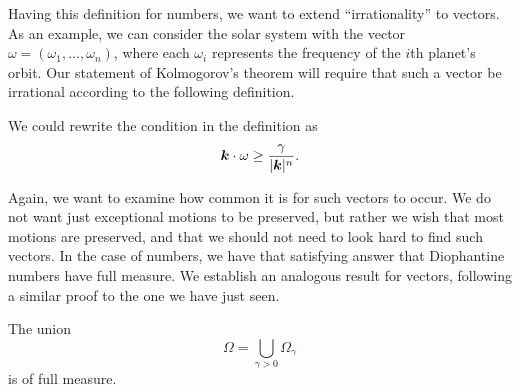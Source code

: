 \documentclass[twoside,letterpaper,10pt]{article}
\begin{document}
Having this definition for numbers, we want to extend ``irrationality'' to
vectors.
As an example, we can consider the solar system with the vector $\omega =
(\omega_1, \ldots, \omega_n)$, where each $\omega_i$ represents the frequency of
the $i$th planet's orbit.
Our statement of Kolmogorov's theorem will require that such a vector be
irrational according to the following definition.
\begin{defn}
  \diovector{}
\end{defn}
We could rewrite the condition in the definition as
\begin{equation}
  \label{eq:diovec}
  \bm{k} \cdot \omega \geq \frac{\gamma}{|\bm{k}|^n}.
\end{equation}

Again, we want to examine how common it is for such vectors to occur.
We do not want just exceptional motions to be preserved, but rather we wish that
most motions are preserved, and that we should not need to look hard to find
such vectors.
In the case of numbers, we have that satisfying answer that Diophantine numbers
have full measure.
We establish an analogous result for vectors, following a similar proof to the
one we have just seen.
\begin{prop}
  The union
  \begin{equation*}
    \Omega = \bigcup_{\gamma > 0} \Omega_{\gamma}
  \end{equation*}
  is of full measure.
\end{prop}
\end{document}
